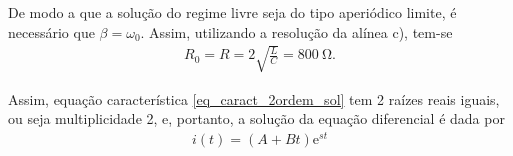\documentclass[a4paper, titlepage, portuguese]{article}
\newcommand\e{\mathrm{e} }
\begin{document}
	\subsubsection{}
	
		\par
		De modo a que a solução do regime livre seja do tipo aperiódico limite, é necessário que $\beta = \omega_{0}$. Assim, utilizando a resolução da alínea c), tem-se 
		\begin{align*}
			 R_0 = R = 2\sqrt{\frac{L}{C}} = \SI{800}{\ohm}.
		\end{align*}
		
		Assim, equação característica \eqref{eq_caract_2ordem_sol} tem 2 raízes reais iguais, ou seja multiplicidade 2, e, portanto, a solução da equação diferencial é dada por
		\begin{align*}
			i ( t ) = ( A + B t ) \e ^ { s t }
		\end{align*}


\end{document}

